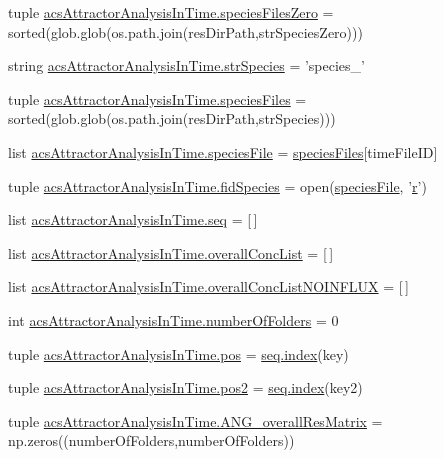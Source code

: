 \begin{DoxyCompactItemize}
\item 
tuple \hyperlink{a00091_a4657fd3a80cf1c76ab075d62d8de3bf3}{acs\-Attractor\-Analysis\-In\-Time.\-species\-Files\-Zero} = sorted(glob.\-glob(os.\-path.\-join(res\-Dir\-Path,str\-Species\-Zero)))
\item 
string \hyperlink{a00091_ac1f05e7db61bcc83ea1ed27460462202}{acs\-Attractor\-Analysis\-In\-Time.\-str\-Species} = 'species\-\_\-'
\item 
tuple \hyperlink{a00091_a18645475f8596346ca431e99661b5674}{acs\-Attractor\-Analysis\-In\-Time.\-species\-Files} = sorted(glob.\-glob(os.\-path.\-join(res\-Dir\-Path,str\-Species)))
\item 
list \hyperlink{a00091_a3c620554bbf7ae30d97a60565fea8d1e}{acs\-Attractor\-Analysis\-In\-Time.\-species\-File} = \hyperlink{a00022_af5703745c2c2a6af7f62da460994d9c2}{species\-Files}\mbox{[}time\-File\-I\-D\mbox{]}
\item 
tuple \hyperlink{a00091_a70d70b9ab98e722475b03465c7f8dbbe}{acs\-Attractor\-Analysis\-In\-Time.\-fid\-Species} = open(\hyperlink{a00021_a7da0c82834970c5f3c3d9224ab832577}{species\-File}, '\hyperlink{a00025_ac862e7284527eb913b1351c8bfb8e079}{r}')
\item 
list \hyperlink{a00091_a1bdf98839177836f238806755e46ac3c}{acs\-Attractor\-Analysis\-In\-Time.\-seq} = \mbox{[}$\,$\mbox{]}
\item 
list \hyperlink{a00091_a2cebadd75179c46e551a2facbdd2741b}{acs\-Attractor\-Analysis\-In\-Time.\-overall\-Conc\-List} = \mbox{[}$\,$\mbox{]}
\item 
list \hyperlink{a00091_ad7eab833592c6cd395f9e2416dd13920}{acs\-Attractor\-Analysis\-In\-Time.\-overall\-Conc\-List\-N\-O\-I\-N\-F\-L\-U\-X} = \mbox{[}$\,$\mbox{]}
\item 
int \hyperlink{a00091_a3a2fe097086bb0f4a505fca8f53dc2b0}{acs\-Attractor\-Analysis\-In\-Time.\-number\-Of\-Folders} = 0
\item 
tuple \hyperlink{a00091_aa39692272363cd6f687c4b2a53f96594}{acs\-Attractor\-Analysis\-In\-Time.\-pos} = \hyperlink{a00054_a0cd6a44ffb07342cbc7e5ac33bfc9495}{seq.\-index}(key)
\item 
tuple \hyperlink{a00091_a49fec7e1deea4728b5ef4a487d155de9}{acs\-Attractor\-Analysis\-In\-Time.\-pos2} = \hyperlink{a00054_a0cd6a44ffb07342cbc7e5ac33bfc9495}{seq.\-index}(key2)
\item 
tuple \hyperlink{a00091_a15adfffa273548845cea67d8b89f0bb1}{acs\-Attractor\-Analysis\-In\-Time.\-A\-N\-G\-\_\-overall\-Res\-Matrix} = np.\-zeros((number\-Of\-Folders,number\-Of\-Folders))

\end{DoxyCompactItemize}
